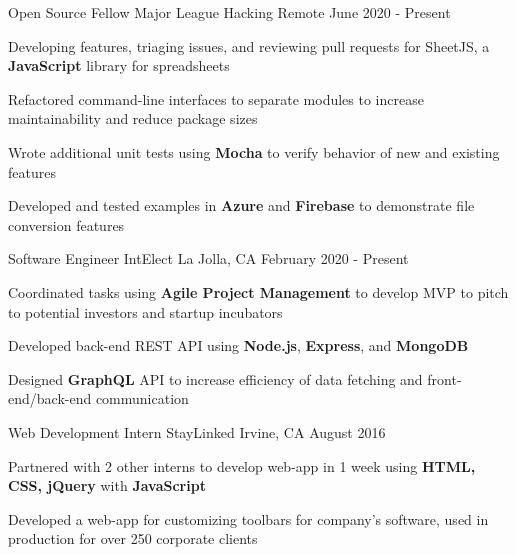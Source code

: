 \documentclass[]{awesome-cv}
\begin{document}
\vspace{-3mm}
\begin{cventries}
	\cventry
	{Open Source Fellow}
	{Major League Hacking}
  {Remote}
	{June 2020 - Present}
	{\begin{cvitems}
    \item {Developing features, triaging issues, and reviewing pull requests for
      SheetJS, a \textbf{JavaScript} library for spreadsheets}
    \item {Refactored command-line interfaces to separate modules to increase
      maintainability and reduce package sizes}
    \item {Wrote additional unit tests using \textbf{Mocha} to verify behavior
      of new and existing features}
    \item {Developed and tested examples in \textbf{Azure} and \textbf{Firebase} to
      demonstrate file conversion features}
		\end{cvitems}}

	\vspace{-3mm}
	\cventry
	{Software Engineer}
	{IntElect}
	{La Jolla, CA}
	{February 2020 - Present}
	{\begin{cvitems}
    \item {Coordinated tasks using \textbf{Agile
      Project Management} to develop MVP to pitch to potential investors and
      startup incubators}
    \item {Developed back-end REST API
      using \textbf{Node.js}, \textbf{Express}, and \textbf{MongoDB}}
    \item {Designed \textbf{GraphQL} API to increase efficiency of data fetching
      and front-end/back-end communication}
		\end{cvitems}}

	\vspace{-3mm}
	\cventry
	{Web Development Intern}
	{StayLinked}
	{Irvine, CA}
	{August 2016}
	{\begin{cvitems}
    \item {Partnered with 2 other interns to develop web-app in 1 week using
      \textbf{HTML, CSS, jQuery} with \textbf{JavaScript}}
		\item {Developed a web-app for customizing toolbars for company’s software,
      used in production for over 250 corporate clients}
		\end{cvitems}}
\end{cventries}
\end{document}
